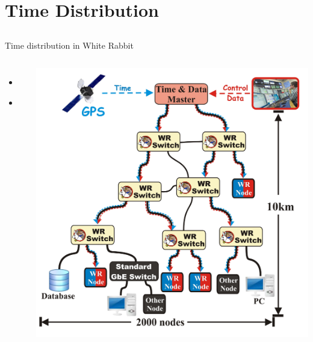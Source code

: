 \documentclass[compress,red]{beamer}
\begin{document}
\section{Time Distribution}
\subsection{}
\begin{frame}{Time distribution in White Rabbit}


\begin{columns}[c]
 
  \begin{itemize}
    \item \textbf{\color{blue!90}{High accuracy/precision synchronization}}
    \item \color{gray}{Deterministic, reliable and low-latency Control Data delivery}
  \end{itemize}

    \begin{center}
   \includegraphics[height=1.0\textwidth]{network/wr_network-enhanced_pro.pdf}
    \end{center}
\end{columns}

\end{frame}
\end{document}
